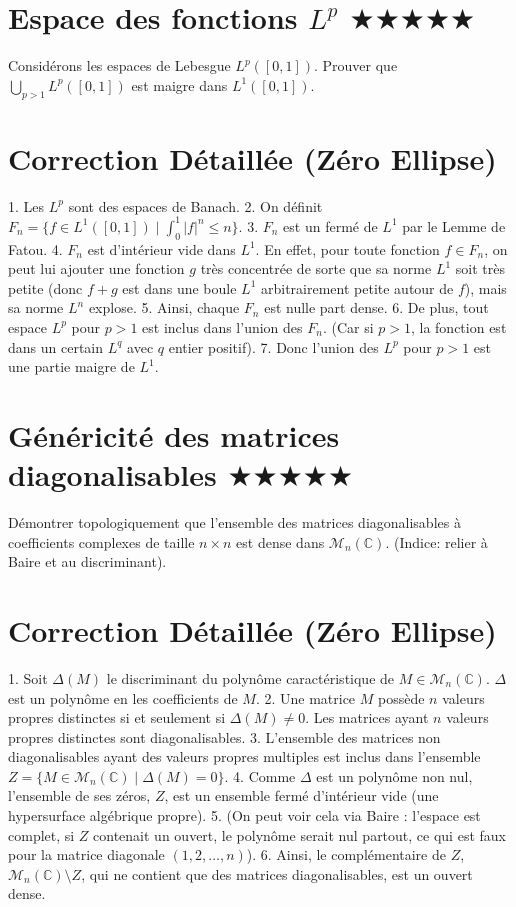 \documentclass[11pt,a4paper]{article}
\begin{document}
\newpage

\section{Espace des fonctions $L^p$ \quad $\bigstar\bigstar\bigstar\bigstar\bigstar$}

Considérons les espaces de Lebesgue $L^p([0,1])$. Prouver que $\bigcup_{p > 1} L^p([0,1])$ est maigre dans $L^1([0,1])$.

\section{Correction Détaillée (Zéro Ellipse)}


1. Les $L^p$ sont des espaces de Banach.
2. On définit $F_n = \{f \in L^1([0,1]) \mid \int_0^1 |f|^n \leq n\}$.
3. $F_n$ est un fermé de $L^1$ par le Lemme de Fatou.
4. $F_n$ est d'intérieur vide dans $L^1$. En effet, pour toute fonction $f \in F_n$, on peut lui ajouter une fonction $g$ très concentrée de sorte que sa norme $L^1$ soit très petite (donc $f+g$ est dans une boule $L^1$ arbitrairement petite autour de $f$), mais sa norme $L^n$ explose.
5. Ainsi, chaque $F_n$ est nulle part dense.
6. De plus, tout espace $L^p$ pour $p > 1$ est inclus dans l'union des $F_n$. (Car si $p > 1$, la fonction est dans un certain $L^q$ avec $q$ entier positif).
7. Donc l'union des $L^p$ pour $p>1$ est une partie maigre de $L^1$.


\newpage

\section{Généricité des matrices diagonalisables \quad $\bigstar\bigstar\bigstar\bigstar\bigstar$}

Démontrer topologiquement que l'ensemble des matrices diagonalisables à coefficients complexes de taille $n \times n$ est dense dans $\mathcal{M}_n(\mathbb{C})$. (Indice: relier à Baire et au discriminant).

\section{Correction Détaillée (Zéro Ellipse)}


1. Soit $\Delta(M)$ le discriminant du polynôme caractéristique de $M \in \mathcal{M}_n(\mathbb{C})$. $\Delta$ est un polynôme en les coefficients de $M$.
2. Une matrice $M$ possède $n$ valeurs propres distinctes si et seulement si $\Delta(M) \neq 0$. Les matrices ayant $n$ valeurs propres distinctes sont diagonalisables.
3. L'ensemble des matrices non diagonalisables ayant des valeurs propres multiples est inclus dans l'ensemble $Z = \{M \in \mathcal{M}_n(\mathbb{C}) \mid \Delta(M) = 0\}$.
4. Comme $\Delta$ est un polynôme non nul, l'ensemble de ses zéros, $Z$, est un ensemble fermé d'intérieur vide (une hypersurface algébrique propre).
5. (On peut voir cela via Baire : l'espace est complet, si $Z$ contenait un ouvert, le polynôme serait nul partout, ce qui est faux pour la matrice diagonale $(1, 2, \dots, n)$).
6. Ainsi, le complémentaire de $Z$, $\mathcal{M}_n(\mathbb{C}) \setminus Z$, qui ne contient que des matrices diagonalisables, est un ouvert dense.
\end{document}
